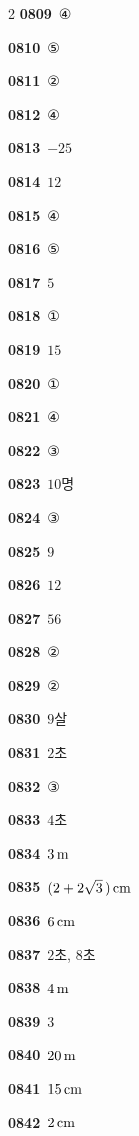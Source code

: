 \documentclass[10pt,a4paper]{article}
\begin{document}
\begin{multicols}{2}
\noindent\textbf{0809}\ ④\par
\noindent\textbf{0810}\ ⑤\par
\noindent\textbf{0811}\ ②\par
\noindent\textbf{0812}\ ④\par
\noindent\textbf{0813}\ $-25$\par
\noindent\textbf{0814}\ $12$\par
\noindent\textbf{0815}\ ④\par
\noindent\textbf{0816}\ ⑤\par
\noindent\textbf{0817}\ $5$\par
\noindent\textbf{0818}\ ①\par
\noindent\textbf{0819}\ $15$\par
\noindent\textbf{0820}\ ①\par
\noindent\textbf{0821}\ ④\par
\noindent\textbf{0822}\ ③\par
\noindent\textbf{0823}\ $10$명\par
\noindent\textbf{0824}\ ③\par
\noindent\textbf{0825}\ $9$\par
\noindent\textbf{0826}\ $12$\par
\noindent\textbf{0827}\ $56$\par
\noindent\textbf{0828}\ ②\par
\noindent\textbf{0829}\ ②\par
\noindent\textbf{0830}\ $9$살\par
\noindent\textbf{0831}\ $2$초\par
\noindent\textbf{0832}\ ③\par
\noindent\textbf{0833}\ $4$초\par
\noindent\textbf{0834}\ $3\mkern3mu \mathrm{m}$\par
\noindent\textbf{0835}\ $(2+2\sqrt{3}\mkern3mu )\mkern3mu \mathrm{cm}$\par
\noindent\textbf{0836}\ $6\mkern3mu \mathrm{cm}$\par
\noindent\textbf{0837}\ $2$초, $8$초\par
\noindent\textbf{0838}\ $4\mkern3mu \mathrm{m}$\par
\noindent\textbf{0839}\ $3$\par
\noindent\textbf{0840}\ $20\mkern3mu \mathrm{m}$\par
\noindent\textbf{0841}\ $15\mkern3mu \mathrm{cm}$\par
\noindent\textbf{0842}\ $2\mkern3mu \mathrm{cm}$\par

\end{multicols}
\end{document}
